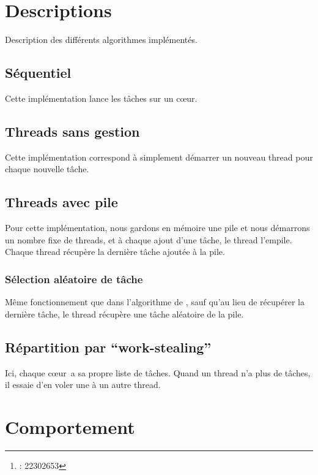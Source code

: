 \documentclass[a4paper]{article}
\title{\docTitle}
\author{\href{\authorMail}{\anri}\thanks{\anri : 22302653}}
\date{Année universitaire 2023-2024}
\def\coeur{c\oe{}ur}
\def\ws{\enquote{work-stealing}}
\newcommand{\docref}[1]{\textit{\nameref{#1}}} %
\begin{document}
\maketitle
\flushbottom
\tableofcontents
\clearpage


\section{Descriptions}
Description des différents algorithmes implémentés.

\subsection{Séquentiel}\label{desc:seq}
Cette implémentation lance les tâches sur un \coeur.

\subsection{Threads sans gestion}\label{desc:threads}
Cette implémentation correspond à simplement démarrer un nouveau thread
pour chaque nouvelle tâche.

\subsection{Threads avec pile}\label{desc:th_pile}
Pour cette implémentation, nous gardons en mémoire une pile et nous démarrons
un nombre fixe de threads, et à chaque ajout d'une tâche, le thread l'empile.
Chaque thread récupère la dernière tâche ajoutée à la pile.

\subsubsection{Sélection aléatoire de tâche}
Même fonctionnement que dans l'algorithme de \docref{desc:th_pile}, sauf
qu'au lieu de récupérer la dernière tâche, le thread récupère une tâche
aléatoire de la pile.

\subsection{Répartition par \ws}\label{desc:ws}
Ici, chaque \coeur~a sa propre liste de tâches. Quand un thread n'a
plus de tâches, il essaie d'en voler une à un autre thread.


\section{Comportement}
\end{document}
